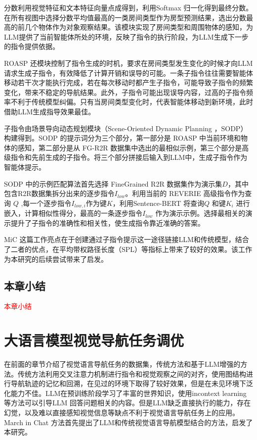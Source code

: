 \documentclass[bachelor]{thesis-uestc}
\begin{document}
分数利用视觉特征和文本特征向量点成得到，利用Softmax 归一化得到最终分数。在所有视图中选择分数平均值最高的一类房间类型作为房型预测结果，选出分数最高的前几个物体作为对象观察结果。该模块实现了房间类型和周围物体的感知，为LLM提供了当前智能体所处的环境，反映了指令的执行阶段，为LLM生成下一步的指令提供依据。

ROASP 还模块控制了指令生成的时机，要求在房间类型发生变化的时候才向LLM请求生成子指令，有效降低了计算开销和误导的可能。一条子指令往往需要智能体移动若干次才能执行完成，若在每次移动时都产生子指令，可能导致子指令的频繁变化，带来不稳定的导航结果。此外，子指令可能出现误导内容，过高的子指令频率不利于传统模型纠偏。只有当房间类型变化时，代表智能体移动到新环境，此时借助LLM生成指导效果最佳。

子指令由场景导向动态规划模块（Scene-Oriented Dynamic Planning ，SODP）构建得到。SODP 的提示词分为三个部分，第一部分是 ROASP 中当前环境和物体的感知，第二部分是从 FG-R2R 数据集中选出的最相似示例，第三个部分是高级指令和先前生成的子指令。将三个部分拼接后输入到LLM中，生成子指令作为智能体提示。

SODP 中的示例匹配算法首先选择 FineGrained R2R 数据集作为演示集$D$，其中包含R2R数据集拆分出来的逐步指令$I_{low}$。利用当前的 REVERIE 高级指令作为查询 $Q$ ,每一个逐步指令$I_{low,i}$作为键$K$，利用Sentence-BERT 将查询$Q$ 和键$K_i$ 进行嵌入，计算相似性得分，最高的一条逐步指令$I_{low}$ 作为演示示例。选择最相关的演示提升了子指令的准确性和相关性，使生成指令靠近准确的答案。

MiC 这篇工作亮点在于创建通过子指令提示这一途径链接LLM和传统模型，结合了二者的优点，在平均带权路径长度（SPL）等指标上带来了较好的效果。该工作为本研究的后续尝试带来了启发。

\section{本章小结}
\textcolor{red}{本章小结}

\chapter{大语言模型视觉导航任务调优}

在前面的章节介绍了视觉语言导航任务的数据集，传统方法和基于LLM增强的方法。传统方法利用交叉注意力机制进行指令和视觉观察之间的对齐，使用图结构进行导航轨迹的记忆和回溯，在见过的环境下取得了较好效果，但是在未见环境下泛化能力不佳。LLM在预训练阶段学习了丰富的世界知识，使用incontext learning等方法可以引导LLM 回答问题相关的内容。但是LLM缺乏直接执行的能力，存在幻觉，以及难以直接感知视觉信息等缺点不利于视觉语言导航任务上的应用。March in Chat 方法首先提出了LLM和传统视觉语言导航模型结合的方法，启发了本研究。
\end{document}
